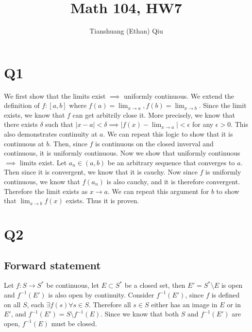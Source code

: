 \documentclass[12pt]{article}
\author{Tianshuang (Ethan) Qiu}
\begin{document}
\title{Math 104, HW7}
\maketitle
\newpage


\section{Q1}
We first show that the limits exist $\implies$ uniformly continuous. We extend the definition of $f: [a,b]$ where $f(a) = \lim_{x\to a}, f(b) = \lim_{x\to b}$. Since the limit exists, we know that $f$ can get arbitrily close it. More precisely, we know that there exists $\delta$ such that $|x-a| < \delta \implies |f(x)-\lim_{x\to a}|<\epsilon$ for any $\epsilon > 0$. This also demonstrates continuity at $a$. We can repeat this logic to show that it is continuous at $b$. Then, since $f$ is continuous on the closed inverval and continuous, it is uniformly continuous.
\newline
Now we show that uniformly continuous $\implies$ limits exist. Let $a_n \in (a,b)$ be an arbitrary sequence that converges to $a$. Then since it is convergent, we know that it is cauchy. Now since $f$ is uniformly continuous, we know that $f(a_n)$ is also cauchy, and it is therefore convergent. Therefore the limit exists as $x \to a$. We can repeat this argument for $b$ to show that $\lim_{x\to b} f(x)$ exists.
\newline
Thus it is proven.
\newpage


\section{Q2}
\subsection{Forward statement}
Let $f: S \to S^{*}$ be continuous, let $E \subset S^{*}$ be a closed set, then $E' = S^{*} \setminus E$ is open and $f^{-1}(E')$ is also open by continuity.
\newline
Consider $f^{-1}(E')$, since $f$ is defined on all $S$, each $\exists f(s) \forall s \in S$. Therefore all $s \in S$ either has an image in $E$ or in $E'$, and $f^{-1}(E') = S \setminus f^{-1}(E)$. Since we know that both $S$ and $f^{-1}(E')$ are open, $f^{-1}(E)$ must be closed.
\end{document}

